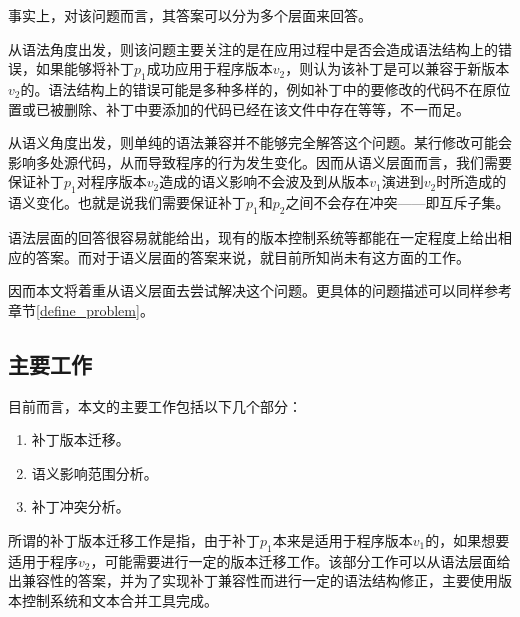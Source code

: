 事实上，对该问题而言，其答案可以分为多个层面来回答。

从语法角度出发，则该问题主要关注的是在应用过程中是否会造成语法结构上的错误，如果能够将补丁$p_1$成功应用于程序版本$v_2$，则认为该补丁是可以兼容于新版本$v_2$的。语法结构上的错误可能是多种多样的，例如补丁中的要修改的代码不在原位置或已被删除、补丁中要添加的代码已经在该文件中存在等等，不一而足。

从语义角度出发，则单纯的语法兼容并不能够完全解答这个问题。某行修改可能会影响多处源代码，从而导致程序的行为发生变化。因而从语义层面而言，我们需要保证补丁$p_1$对程序版本$v_2$造成的语义影响不会波及到从版本$v_1$演进到$v_2$时所造成的语义变化。也就是说我们需要保证补丁$p_1$和$p_2$之间不会存在冲突——即互斥子集。

语法层面的回答很容易就能给出，现有的版本控制系统等都能在一定程度上给出相应的答案。而对于语义层面的答案来说，就目前所知尚未有这方面的工作。

因而本文将着重从语义层面去尝试解决这个问题。更具体的问题描述可以同样参考章节\ref {define_problem}。


\subsection{主要工作}

目前而言，本文的主要工作包括以下几个部分：

\begin{enumerate}
	\item 补丁版本迁移。
	\item 语义影响范围分析。
	\item 补丁冲突分析。		
\end{enumerate}

%		
%		

所谓的补丁版本迁移工作是指，由于补丁$p_1$本来是适用于程序版本$v_1$的，如果想要适用于程序$v_2$，可能需要进行一定的版本迁移工作。该部分工作可以从语法层面给出兼容性的答案，并为了实现补丁兼容性而进行一定的语法结构修正，主要使用版本控制系统和文本合并工具完成。

